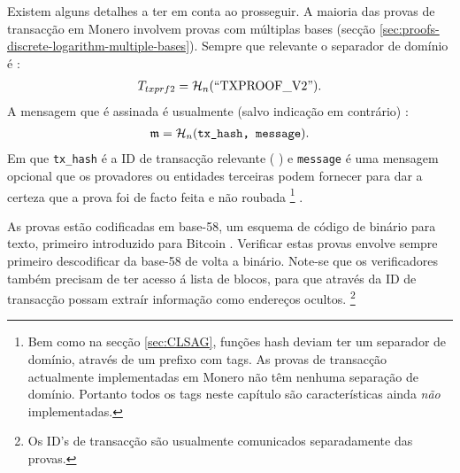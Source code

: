 Existem alguns detalhes a ter em conta ao prosseguir. A maioria das provas de transacção em Monero involvem provas com múltiplas bases (secção \ref{sec:proofs-discrete-logarithm-multiple-bases}). Sempre que relevante o separador de domínio é : 
\begin{align*}
T_{txprf2} = \mathcal{H}_n(``\textrm{TXPROOF\_V2}").
\end{align*}
A mensagem que é assinada é usualmente (salvo indicação em contrário) : 
\begin{align*}
\mathfrak{m} = \mathcal{H}_n(\texttt{tx\_hash, \texttt{message}}).
\end{align*}
Em que {\tt tx\_hash} é a ID de transacção relevante (
) 
e {\tt message} é uma mensagem opcional que os provadores ou entidades terceiras podem fornecer para dar a certeza que a prova foi de facto feita e não roubada \footnote{Bem como na secção \ref{sec:CLSAG}, funções hash deviam ter um separador de domínio, através de um prefixo com tags. As provas de transacção actualmente implementadas em Monero não têm nenhuma separação de domínio. Portanto todos os tags neste capítulo são características ainda {\em não} implementadas.} .  


As provas estão codificadas em base-58, um esquema de código de binário para texto, primeiro introduzido para Bitcoin \cite{base-58-encoding}. Verificar estas provas envolve sempre primeiro descodificar da base-58 de volta a binário. Note-se que os verificadores também precisam de ter acesso á lista de blocos, para que através da ID de transacção possam extraír informação como endereços ocultos.
\footnote{Os ID's de transacção são usualmente comunicados separadamente das provas.}
 
